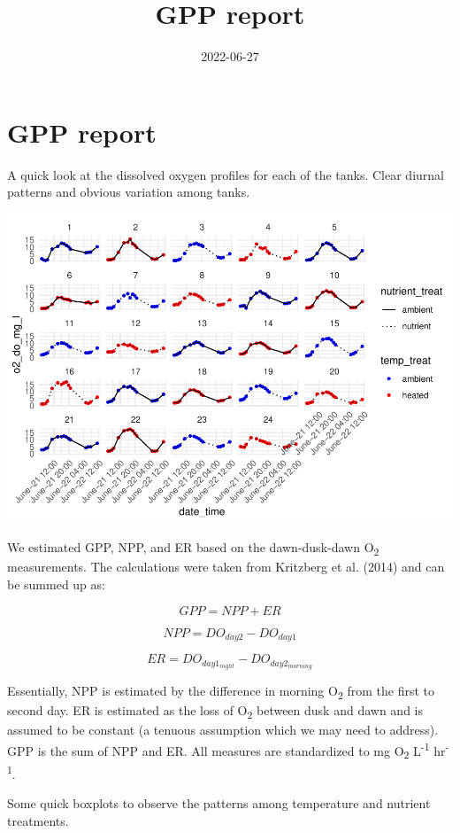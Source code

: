 \documentclass[
]{article}
\title{GPP report}
\author{}
\date{\vspace{-2.5em}2022-06-27}
\begin{document}
\maketitle

\hypertarget{gpp-report}{%
\section{GPP report}\label{gpp-report}}

A quick look at the dissolved oxygen profiles for each of the tanks.
Clear diurnal patterns and obvious variation among tanks.

\includegraphics{GPP-report_files/figure-latex/DO profiles-1.pdf}

We estimated GPP, NPP, and ER based on the dawn-dusk-dawn
O\textsubscript{2} measurements. The calculations were taken from
Kritzberg et al. (2014) and can be summed up as:

\[ GPP = NPP + ER \]

\[ NPP = DO_{day2} - DO_{day1} \]

\[ ER = DO_{day1_{night}} - DO_{day2_{morning}} \]

Essentially, NPP is estimated by the difference in morning
O\textsubscript{2} from the first to second day. ER is estimated as the
loss of O\textsubscript{2} between dusk and dawn and is assumed to be
constant (a tenuous assumption which we may need to address). GPP is the
sum of NPP and ER. All measures are standardized to mg
O\textsubscript{2} L\textsuperscript{-1} hr\textsuperscript{-1}.

Some quick boxplots to observe the patterns among temperature and
nutrient treatments.
\end{document}
